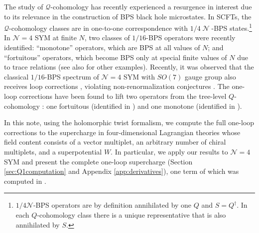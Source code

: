 \documentclass[11pt]{article}
\DeclareMathOperator{\calN}{\mathcal{N}}
\renewcommand{\bm}{\mathcal}
\begin{document}
The study of $\bm{Q}$-cohomology has recently experienced a resurgence in interest due to its relevance in the construction of BPS black hole microstates. In SCFTs, the $\bm{Q}$-cohomology classes are in one-to-one correspondence with $1/4\calN$-BPS states.\footnote{$1/4\mathcal{N}$-BPS operators are by definition annihilated by one $Q$ and $S=Q^\dagger$. In each $Q$-cohomology class there is a unique representative that is also annihilated by $S$.} In $\mathcal{N}=4$ SYM at finite $N$, two classes of $1/16$-BPS operators were recently identified: ``monotone'' operators, which are BPS at all values of $N$; and ``fortuitous'' operators, which become BPS only at special finite values of $N$ due to trace relations \cite{Chang:2022mjp, Choi:2022caq, Choi:2023znd, Budzik:2023vtr, Choi:2023vdm, Chang:2024zqi, deMelloKoch:2024pcs, Gaikwad:2025ugk} (see also \cite{Chang:2024lxt, Chen:2025sum, Chang:2025rqy, Kim:2025vup, Chang:2025wgo, belin2025fortuityabjm} for other examples). Recently, it was observed that the classical $1/16$-BPS spectrum of $\mathcal{N}=4$ SYM with $SO(7)$ gauge group also receives loop corrections \cite{Chang:2025mqp, Choi:2025bhi}, violating non-renormalization conjectures \cite{Grant:2008sk, Chang:2022mjp}. The one-loop corrections have been found to lift two operators from the tree-level $Q$-cohomology \cite{Choi:2025bhi}: one fortuitous (identified in \cite{Gadde:2025yoa, Chang:2025mqp}) and one monotone (identified in \cite{Chang:2025mqp}).

In this note, using the holomorphic twist formalism, we compute the full one-loop corrections to the supercharge in four-dimensional Lagrangian theories whose field content consists of a vector multiplet, an arbitrary number of chiral multiplets, and a superpotential $W$. In particular, we apply our results to $\mathcal{N}=4$ SYM and present the complete one-loop supercharge (Section \ref{sec:Q1computation} and Appendix \ref{app:derivatives}), one term of which was computed in \cite{Choi:2025bhi}.
\end{document}
